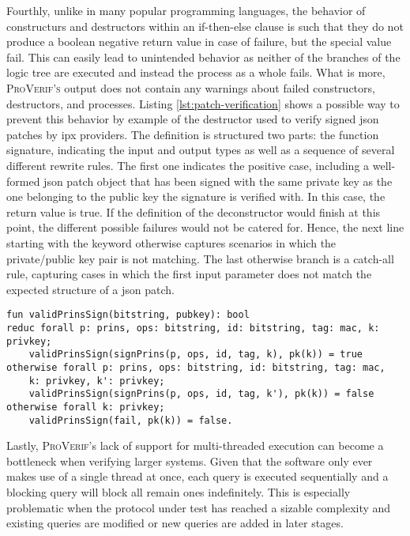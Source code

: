 Fourthly, unlike in many popular programming languages, the behavior of constructurs and destructors within an if-then-else clause is such that they do not produce a boolean negative return value in case of failure, but the special value {\sffamily fail}.
This can easily lead to unintended behavior as neither of the branches of the logic tree are executed and instead the process as a whole fails.
What is more, \textsc{ProVerif's} output does not contain any warnings about failed constructors, destructors, and processes.
Listing \ref{lst:patch-verification} shows a possible way to prevent this behavior by example of the destructor used to verify signed \gls{json} patches by \gls{ipx} providers.
The definition is structured two parts: the function signature, indicating the input and output types as well as a sequence of several different rewrite rules.
The first one indicates the positive case, including a well-formed \gls{json} patch object that has been signed with the same private key as the one belonging to the public key the signature is verified with.
In this case, the return value is true.
If the definition of the deconstructor would finish at this point, the different possible failures would not be catered for.
Hence, the next line starting with the keyword {\sffamily otherwise} captures scenarios in which the private/public key pair is not matching.
The last {\sffamily otherwise} branch is a catch-all rule, capturing cases in which the first input parameter does not match the expected structure of a \gls{json} patch.

\begin{lstlisting}[caption={Custom channel declarations},label={lst:patch-verification},firstnumber=23]
fun validPrinsSign(bitstring, pubkey): bool
reduc forall p: prins, ops: bitstring, id: bitstring, tag: mac, k: privkey;
    validPrinsSign(signPrins(p, ops, id, tag, k), pk(k)) = true
otherwise forall p: prins, ops: bitstring, id: bitstring, tag: mac,
    k: privkey, k': privkey;
    validPrinsSign(signPrins(p, ops, id, tag, k'), pk(k)) = false
otherwise forall k: privkey;
    validPrinsSign(fail, pk(k)) = false.
\end{lstlisting}


Lastly, \textsc{ProVerif}'s lack of support for multi-threaded execution can become a bottleneck when verifying larger systems.
Given that the software only ever makes use of a single thread at once, each query is executed sequentially and a blocking query will block all remain ones indefinitely.
This is especially problematic when the protocol under test has reached a sizable complexity and existing queries are modified or new queries are added in later stages.


